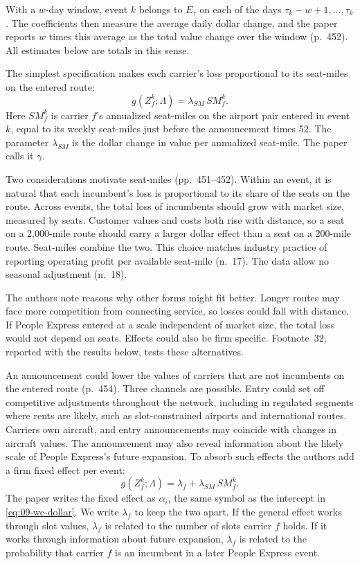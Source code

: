 With a $w$-day window, event $k$ belongs to $E_\tau$ on each of the days $\tau_k-w+1,\dots,\tau_k$.
The coefficients then measure the average daily dollar change, and the paper reports $w$ times this
average as the total value change over the window (p.~452). All estimates below are totals in
this sense.

The simplest specification makes each carrier's loss proportional to its seat-miles on the entered
route:
\begin{equation}\label{eq:09-wc-sm}
g(Z^k_f;\Lambda)=\lambda_{SM}\,\mathit{SM}^k_f .
\end{equation}
Here $\mathit{SM}^k_f$ is carrier $f$'s annualized seat-miles on the airport pair entered in event
$k$, equal to its weekly seat-miles just before the announcement times 52. The parameter
$\lambda_{SM}$ is the dollar change in value per annualized seat-mile. The paper calls it $\gamma$.

Two considerations motivate seat-miles (pp.~451--452). Within an event, it is natural that
each incumbent's loss is proportional to its share of the seats on the route. Across events, the total
loss of incumbents should grow with market size, measured by seats. Customer values and costs both
rise with distance, so a seat on a 2,000-mile route should carry a larger dollar effect than a seat on
a 200-mile route. Seat-miles combine the two. This choice matches industry practice of reporting
operating profit per available seat-mile (n.~17). The data allow no seasonal adjustment
(n.~18).

The authors note reasons why other forms might fit better. Longer routes may face more competition from
connecting service, so losses could fall with distance. If People Express entered at a scale
independent of market size, the total loss would not depend on seats. Effects could also be firm
specific. Footnote~32, reported with the results below, tests these alternatives.

An announcement could lower the values of carriers that are not incumbents on the entered route
(p.~454). Three channels are possible. Entry could set off competitive adjustments throughout
the network, including in regulated segments where rents are likely, such as slot-constrained airports
and international routes. Carriers own aircraft, and entry announcements may coincide with changes in
aircraft values. The announcement may also reveal information about the likely scale of People
Express's future expansion. To absorb such effects the authors add a firm fixed effect per event:
\begin{equation}\label{eq:09-wc-fe}
g(Z^k_f;\Lambda)=\lambda_f+\lambda_{SM}\,\mathit{SM}^k_f .
\end{equation}
The paper writes the fixed effect as $\alpha_i$, the same symbol as the intercept in
\eqref{eq:09-wc-dollar}. We write $\lambda_f$ to keep the two apart. If the general effect works
through slot values, $\lambda_f$ is related to the number of slots carrier $f$ holds. If it works
through information about future expansion, $\lambda_f$ is related to the probability that carrier $f$
is an incumbent in a later People Express event.

